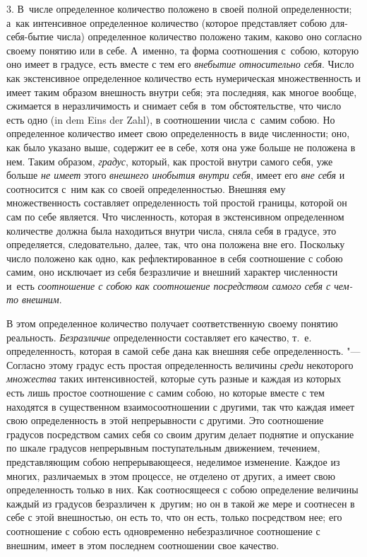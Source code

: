 3. В~числе определенное количество положено в своей полной определенности;
а~как интенсивное определенное количество (которое представляет собою
для-себя-бытие числа) определенное количество положено таким, каково оно
согласно своему понятию или в себе. А~именно, та форма соотношения с~собою,
которую оно имеет в градусе, есть вместе с тем его {\em внебытие относительно
себя}. Число как экстенсивное определенное количество есть нумерическая
множественность и имеет таким образом внешность внутри себя; эта последняя, как
многое вообще, сжимается в неразличимость и снимает себя в~том обстоятельстве,
что число есть одно (in dem Eins der Zahl), в соотношении числа с~самим собою.
Но определенное количество имеет свою определенность в виде численности; оно,
как было указано выше, содержит ее в себе, хотя она уже больше не положена в
нем. Таким образом, {\em градус}, который, как простой внутри самого себя, уже
больше {\em не имеет} этого {\em внешнего инобытия внутри себя}, имеет его
{\em вне себя} и соотносится с~ним как со своей определенностью. Внешняя ему
множественность составляет определенность той простой границы, которой он сам
по себе является. Что численность, которая в экстенсивном определенном
количестве должна была находиться внутри числа, сняла себя в градусе, это
определяется, следовательно, далее, так, что она положена вне его. Поскольку
число положено как одно, как рефлектированное в себя соотношение с собою самим,
оно исключает из себя безразличие и внешний характер численности и~есть
{\em соотношение с собою как соотношение посредством
самого себя с чем-то внешним}.

В этом определенное количество получает соответственную своему понятию
реальность. {\em Безразличие} определенности составляет его качество, т.~е.
определенность, которая в самой себе дана как внешняя себе определенность. "---
Согласно этому градус есть простая определенность величины {\em среди}
некоторого {\em множества} таких интенсивностей, которые суть разные и каждая
из которых есть лишь простое соотношение с самим собою, но которые вместе с тем
находятся в существенном взаимосоотношении с другими, так что каждая имеет свою
определенность в этой непрерывности с другими. Это соотношение градусов
посредством самих себя со своим другим делает поднятие и опускание по шкале
градусов непрерывным поступательным движением, течением, представляющим собою
непрерывающееся, неделимое изменение. Каждое из многих, различаемых в этом
процессе, не отделено от других, а имеет свою определенность только в них. Как
соотносящееся с собою определение величины каждый из градусов безразличен
к~другим; но он в такой же мере и соотнесен в себе с этой внешностью, он есть
то, что он есть, только посредством нее; его соотношение с собою есть
одновременно небезразличное соотношение с внешним, имеет в этом последнем
соотношении свое качество.


